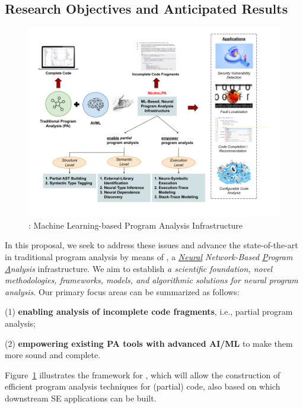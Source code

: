 \subsection{Research Objectives and Anticipated Results}

\begin{figure}[t]
    \centering
    \includegraphics[width=\textwidth]{figures/infra-design-2.png}
    \vspace{-40pt}
    \caption{{\tool}: Machine Learning-based Program Analysis Infrastructure}
    \label{fig:arch}
\end{figure}


In this proposal, we seek to address these issues and advance the state-of-the-art in traditional program analysis by means of {\tool}, a {\em \underline{Neural} Network-Based \underline{P}rogram \underline{A}nalysis} infrastructure. We aim to establish {\em a scientific foundation, novel methodologies, frameworks, models, and algorithmic solutions for neural program analysis}. Our primary focus areas can be summarized as follows: 

(1) {\bf enabling analysis of incomplete code fragments}, i.e., partial program analysis;

(2) {\bf empowering existing PA tools with advanced AI/ML
} to make them more sound and complete.

\noindent Figure~\ref{fig:arch} illustrates the 
framework for {\tool}, which will allow the construction of efficient program analysis techniques for (partial) code, also based on which downstream 
SE applications can be built.



